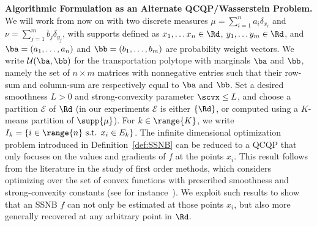 \textbf{Algorithmic Formulation as an Alternate QCQP/Wasserstein Problem.} We will work from now on with two discrete measures $\mu = \sum_{i=1}^n a_i \delta_{x_i}$ and $\nu = \sum_{j=1}^m b_j \delta_{y_j}$, with supports defined as $x_1, \ldots x_n \in \Rd$, $y_1, \ldots y_m \in \Rd$, and $\ba=(a_1,\dots,a_n)$ and $\bb=(b_1,\dots,b_m)$ are probability weight vectors. We write $\mathcal{U}(\ba,\bb)$ for the transportation polytope with marginals $\ba$ and $\bb$, namely the set of $n\times m$ matrices with nonnegative entries such that their row-sum and column-sum are respectively equal to $\ba$ and $\bb$. Set a desired smoothness $L > 0$ and strong-convexity parameter $\scvx \leq L$, and choose a partition $\mathcal{E}$ of $\Rd$ (in our experiments $\mathcal{E}$ is either $\{\Rd\}$, or computed using a $K$-means partition of $\supp{\mu}$). For $k \in \range{K}$, we write $I_k = \left\{ i \in \range{n} \text{ s.t. } x_i \in E_k \right\}$. The infinite dimensional optimization problem introduced in Definition~\ref{def:SSNB} can be reduced to a QCQP that only focuses on the values and gradients of $f$ at the points $x_i$. This result follows from the literature in the study of first order methods, which considers optimizing over the set of convex functions with prescribed smoothness and strong-convexity constants (see for instance~\citep[Theorem 3.8 and Theorem 3.14]{taylor2017convex}). We exploit such results to show that an SSNB $f$ can not only be estimated at those points $x_i$, but also more generally recovered at any arbitrary point in $\Rd$.

